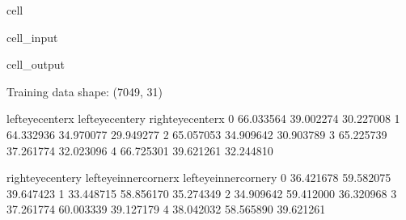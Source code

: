 \documentclass[letterpaper,10pt,english]{jupyterBook}
\begin{document}
\begin{sphinxuseclass}{cell}\begin{sphinxVerbatimInput}

\begin{sphinxuseclass}{cell_input}
\begin{sphinxVerbatim}[commandchars=\\\{\}]

  
 
  
\end{sphinxVerbatim}

\end{sphinxuseclass}\end{sphinxVerbatimInput}
\begin{sphinxVerbatimOutput}

\begin{sphinxuseclass}{cell_output}
\begin{sphinxVerbatim}[commandchars=\\\{\}]
Training data shape: (7049, 31)
\end{sphinxVerbatim}

\begin{sphinxVerbatim}[commandchars=\\\{\}]
   left\PYGZus{}eye\PYGZus{}center\PYGZus{}x  left\PYGZus{}eye\PYGZus{}center\PYGZus{}y  right\PYGZus{}eye\PYGZus{}center\PYGZus{}x  \PYGZbs{}
0          66.033564          39.002274           30.227008   
1          64.332936          34.970077           29.949277   
2          65.057053          34.909642           30.903789   
3          65.225739          37.261774           32.023096   
4          66.725301          39.621261           32.244810   

   right\PYGZus{}eye\PYGZus{}center\PYGZus{}y  left\PYGZus{}eye\PYGZus{}inner\PYGZus{}corner\PYGZus{}x  left\PYGZus{}eye\PYGZus{}inner\PYGZus{}corner\PYGZus{}y  \PYGZbs{}
0           36.421678                59.582075                39.647423   
1           33.448715                58.856170                35.274349   
2           34.909642                59.412000                36.320968   
3           37.261774                60.003339                39.127179   
4           38.042032                58.565890                39.621261   


\end{sphinxVerbatim}
\end{sphinxuseclass}
\end{sphinxVerbatimOutput}
\end{sphinxuseclass}
\end{document}
